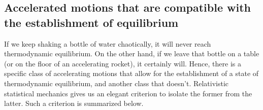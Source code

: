 \documentclass[a4paper, amsfonts, amssymb, amsmath, reprint, showkeys, nofootinbib, twoside, onecolumn,notitlepage]{revtex4-1}
\theoremstyle{definition}
\theoremstyle{theorem}
\begin{document}

\vspace{-0.3cm}
\subsection{Accelerated motions that are compatible with the establishment of equilibrium}\label{IIAAA}
\vspace{-0.3cm}

If we keep shaking a bottle of water chaotically, it will never reach thermodynamic equilibrium. On the other hand, if we leave that bottle on a table (or on the floor of an accelerating rocket), it certainly will. Hence, there is a specific class of accelerating motions that allow for the establishment of a state of thermodynamic equilibrium, and another class that doesn't. Relativistic statistical mechanics gives us an elegant criterion to isolate the former from the latter. Such a criterion is summarized below.
\end{document}
